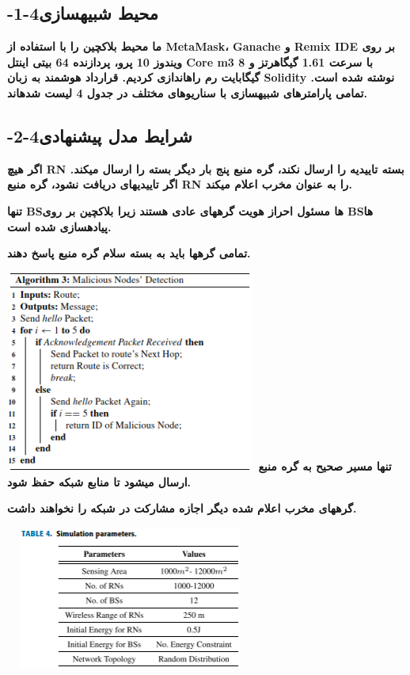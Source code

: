 \documentclass{article} %
\begin{document}
\subsection{ -1-4محیط شبیهسازی}

\noindent 
{\bf ما محیط بلاکچین را با استفاده از MetaMask، Ganache و Remix IDE بر روی ویندوز 10 پرو، پردازنده 64 بیتی اینتل Core m3 با سرعت 1.61 گیگاهرتز و 8 گیگابایت رم راهاندازی کردیم. قرارداد هوشمند به زبان Solidity نوشته شده است. تمامی پارامترهای شبیهسازی با سناریوهای مختلف در جدول 4 لیست شدهاند.}

\noindent 
\subsection{ -2-4شرایط مدل پیشنهادی}

\noindent 
{\bf  اگر هیچ RN بسته تاییدیه را ارسال نکند، گره منبع پنج بار دیگر بسته را ارسال میکند. اگر تاییدیهای دریافت نشود، گره منبع RN را به عنوان مخرب اعلام میکند.}

\noindent 
{\bf  تنها BSها مسئول احراز هویت گرههای عادی هستند زیرا بلاکچین بر روی BSها پیادهسازی شده است.}

\noindent 
{\bf  تمامی گرهها باید به بسته سلام گره منبع پاسخ دهند.}

\noindent 
{\bf \includegraphics*[width=3.25in, height=2.61in]{image12} تنها مسیر صحیح به گره منبع ارسال میشود تا منابع شبکه حفظ شود.}

\noindent 
{\bf  گرههای مخرب اعلام شده دیگر اجازه مشارکت در شبکه را نخواهند داشت.}

\noindent 
{\bf \includegraphics*[width=3.24in, height=1.85in]{image13}}
\end{document}
